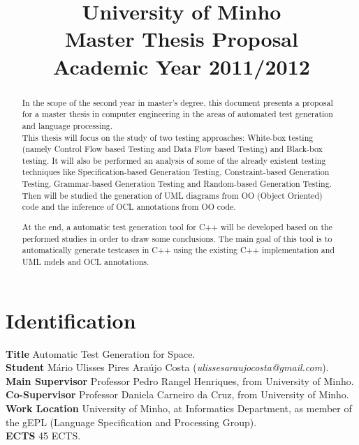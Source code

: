 \documentclass[a4paper,12pt]{article}
\title{\huge \bigskip
{\LARGE University of Minho}\\[13pt]
{\large Master Thesis Proposal}\\[13pt]
{\large Academic Year 2011/2012}
}\author{}\date{}
\begin{document}
\maketitle
{}

\section*{\Large Identification}
\textbf{Title} Automatic Test Generation for Space.\\[6pt]
\textbf{Student} Mário Ulisses Pires Araújo Costa (\emph{ulissesaraujocosta@gmail.com}).\\[6pt]
\textbf{Main Supervisor} Professor Pedro Rangel Henriques, from University of Minho.\\[6pt]
\textbf{Co-Supervisor} Professor Daniela Carneiro da Cruz, from University of Minho.\\[6pt]
\textbf{Work Location} University of Minho, at Informatics Department, as member of the gEPL (Language Specification and Processing Group).\\[6pt]
\textbf{ECTS} 45 ECTS.\\[12pt]

\begin{abstract}
In the scope of the second year in master's degree, this document presents a proposal for a master thesis in computer engineering in
the areas of automated test generation and language processing.\\[6pt]
This thesis will focus on the study of two testing approaches: White-box testing
(namely Control Flow based Testing\cite{stt} and Data Flow based Testing\cite{dataflow})
and Black-box testing\cite{black}.
It will also be performed an analysis of some of the already existent testing techniques like
Specification-based Generation Testing\cite{Offutt:1999:GTU:1767297.1767341,Horcher95improvingsoftware,Stocks:1996:FST:239916.239918},
Constraint-based Generation Testing\cite{DeMillo91constraint-basedautomatic},
Grammar-based Generation Testing\cite{1994-burgess,Burgess_Saidi_1996}
and Random-based Generation Testing.
Then will be studied the generation of UML diagrams from OO (Object Oriented) code and the inference of OCL annotations from OO code.

At the end, a automatic test generation tool for C++ will be developed based on the performed studies in order to draw some conclusions.
The main goal of this tool is to automatically generate testcases in C++ using the existing C++ implementation and UML mdels and OCL annotations.
\end{abstract}
\end{document}
